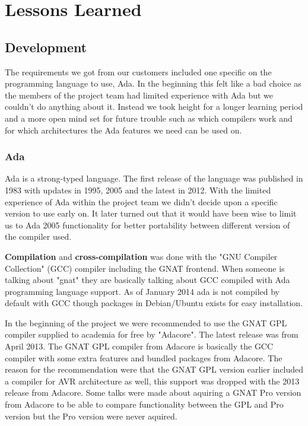 \section{Lessons Learned}\label{sec:lessons_learned}

\subsection{Development}
The requirements we got from our customers included one specific on the
programming language to use, Ada. In the beginning this felt like a bad choice
as the members of the project team had limited experience with Ada but we
couldn't do anything about it. Instead we took height for a longer learning
period and a more open mind set for future trouble such as which compilers work
and for which architectures the Ada features we need can be used on.

\subsubsection{Ada}
Ada is a strong-typed language. The first release of the language was published
in 1983 with updates in 1995, 2005 and the latest in 2012. With the limited
experience of Ada within the project team we didn't decide upon a specific version
to use early on. It later turned out that it would have been wise to limit us to
Ada 2005 functionality for better portability between different version of
the compiler used.

\textbf{Compilation} and \textbf{cross-compilation} was done with the
"GNU Compiler Collection" (GCC) compiler including the GNAT frontend. When
someone is talking about "gnat" they are basically talking about GCC compiled
with Ada programming language support. As of January 2014 ada is not compiled
by default with GCC though packages in Debian/Ubuntu exists for easy installation.

In the beginning of the project we were recommended to use the GNAT GPL compiler
supplied to academia for free by "Adacore". The latest release was from April
2013. The GNAT GPL compiler from Adacore is basically the GCC compiler with
some extra features and bundled packages from Adacore. The reason for the
recommendation were that the GNAT GPL version earlier included a compiler for
AVR architecture as well, this support was dropped with the 2013 release from
Adacore. Some talks were made about aquiring a GNAT Pro version from Adacore to
be able to compare functionality between the GPL and Pro version but the Pro 
version were never aquired.

